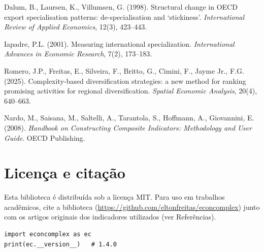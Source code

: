 \documentclass[12pt, a4paper]{article}
\begin{document}
\begin{description}[leftmargin=1.5em, style=nextline]
  \item[Dalum, Laursen \& Villumsen (1998)]
    Dalum, B., Laursen, K., Villumsen, G. (1998). Structural change in
    OECD export specialisation patterns: de-specialisation and
    `stickiness'. \textit{International Review of Applied Economics},
    12(3), 423--443.

  \item[Iapadre (2001)]
    Iapadre, P.L. (2001). Measuring international specialization.
    \textit{International Advances in Economic Research}, 7(2), 173--183.

  \item[Romero et al.\ (2025)]
    Romero, J.P., Freitas, E., Silveira, F., Britto, G., Cimini, F.,
    Jayme Jr., F.G. (2025). Complexity-based diversification strategies:
    a new method for ranking promising activities for regional
    diversification. \textit{Spatial Economic Analysis}, 20(4), 640--663.

  \item[Nardo et al.\ (2008)]
    Nardo, M., Saisana, M., Saltelli, A., Tarantola, S., Hoffmann, A.,
    Giovannini, E. (2008). \textit{Handbook on Constructing Composite
    Indicators: Methodology and User Guide}. OECD Publishing.

\end{description}

\section{Licen\c{c}a e cita\c{c}\~{a}o}

Esta biblioteca \'{e} distribu\'{i}da sob a licen\c{c}a MIT. Para uso em
trabalhos acad\^{e}micos, cite a biblioteca
(\url{https://github.com/eltonfreitas/econcomplex}) junto com os artigos
originais dos indicadores utilizados (ver Refer\^{e}ncias).

\begin{lstlisting}[language={}, caption={Verificar vers\~{a}o da biblioteca}]
import econcomplex as ec
print(ec.__version__)   # 1.4.0
\end{lstlisting}
\end{document}
